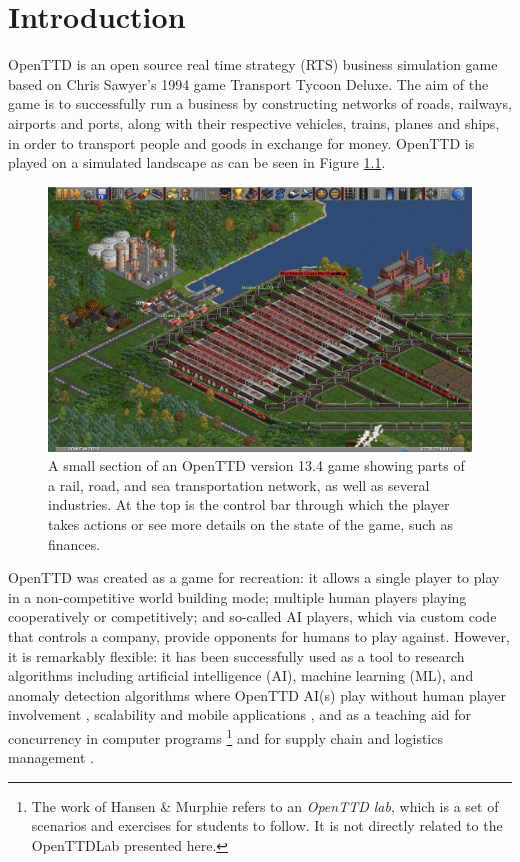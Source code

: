 \documentclass[logo,msc,dsti]{style/infthesis}    %
\newcommand{\singlespacedfootnote}[1]{{\singlespace\footnote{#1}}}
\begin{document}
\chapter{Introduction}
\label{chapter:introduction}

OpenTTD \cite{openttd} is an open source real time strategy (RTS) business simulation game based on  Chris Sawyer's 1994 game Transport Tycoon Deluxe. The aim of the game is to successfully run a business by constructing networks of roads, railways, airports and ports, along with their respective vehicles, trains, planes and ships, in order to transport people and goods in exchange for money. OpenTTD is played on a simulated landscape as can be seen in Figure \ref{figure:introduction-screenshot}.

\begin{figure}[ht]
\centering
\includegraphics[width=\columnwidth]{assets/openttd_screenshot.png}
\caption{A small section of an OpenTTD version 13.4 game showing parts of a rail, road, and sea transportation network, as well as several industries. At the top is the control bar through which the player takes actions or see more details on the state of the game, such as finances.}
\label{figure:introduction-screenshot}
\end{figure}

OpenTTD was created as a game for recreation: it allows a single player to play in a non-competitive world building mode; multiple human players playing cooperatively or competitively; and so-called AI players, which via custom code that controls a company, provide opponents for humans to play against. However, it is remarkably flexible: it has been successfully used as a tool to research algorithms including artificial intelligence (AI), machine learning (ML), and anomaly detection algorithms where OpenTTD AI(s) play without human player involvement \cite{beuneker2019autonomous, bijlsma2014evolving, konijnendijk2015mcts, lakomy2020railroad, rios2009trains, wisniewski2011artificial, volna2017fuzzy}, scalability and mobile applications \cite{jiang2018mirroring}, and as a teaching aid for concurrency in computer programs \cite{HansenMuprhie2018, marmorstein2015teaching}\singlespacedfootnote{The work of Hansen \& Murphie \cite{HansenMuprhie2018} refers to an \emph{OpenTTD lab}, which is a set of scenarios and exercises for students to follow. It is not directly related to the OpenTTDLab presented here.} and for supply chain and logistics management \cite{doi:10.1080/10494820.2016.1242503}.
\end{document}

